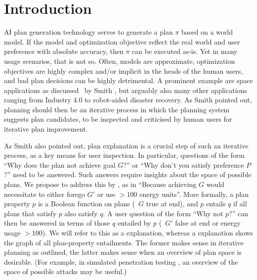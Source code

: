 \section{Introduction}
\label{introduction}

AI plan generation technology serves to generate a plan $\pi$ based on
a world model. If the model and optimization objective reflect the
real world and user preference with absolute accuracy, then $\pi$ can
be executed as-is. Yet in many usage scenarios, that is not so. Often,
models are approximate, optimization objectives are highly complex
and/or implicit in the heads of the human users, and bad plan
decisions can be highly detrimental. A prominent example are space
applications as discussed \eg\ by Smith , but
arguably also many other applications ranging from Industry 4.0 to
robot-aided disaster recovery. As Smith pointed out, planning should
then be an iterative process in which the planning system suggests
plan candidates, to be inspected and criticised by human users for
iterative plan improvement.

As Smith also pointed out, plan explanation is a crucial step of such
an iterative process, as a key means for user inspection. In
particular, questions of the form ``Why does the plan not achieve goal
$G$?'' or ``Why don't you satisfy preference $P$?'' need to be
answered. Such answers require insights about the space of possible
plans. We propose to address this by , as in ``Because achieving $G$ would necessitate to
either forego $G'$ or use $> 100$ energy units''. More formally, a
plan property $p$ is a Boolean function on plans (\eg\ $G$ true at
end), and $p$ entails $q$ if all plans that satisfy $p$ also satisfy
$q$.  A user question of the form ``Why not $p$?'' can then be
answered in terms of those $q$ entailed by $p$ (\eg\ $G'$ false at end
or energy usage $> 100$). We will refer to this as a 
explanation, whereas a  explanation shows the graph of
all plan-property entailments. The former makes sense in iterative
planning as outlined, the latter makes sense when an overview of plan
space is desirable. (For example, in simulated penetration testing
\cite{boddy:etal:icaps-05,hoffmann:icaps-15}, an overview of the space
of possible attacks may be useful.)
%
  
